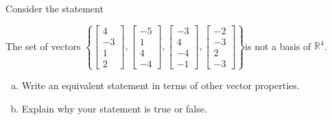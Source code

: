 
\begin{exerciseStatement}


Consider the statement 
\begin{center}\begin{minipage}{0.8\textwidth}
 The set of vectors \( \left\{ \left[\begin{array}{c}
4 \\
-3 \\
1 \\
2
\end{array}\right] , \left[\begin{array}{c}
-5 \\
1 \\
4 \\
-4
\end{array}\right] , \left[\begin{array}{c}
-3 \\
4 \\
-4 \\
-1
\end{array}\right] , \left[\begin{array}{c}
-2 \\
-3 \\
2 \\
-3
\end{array}\right] \right\} \)is not a basis of \(\mathbb{R}^4\). 
\end{minipage}\end{center}
    


\begin{enumerate}[(a)]
\item  Write an equivalent statement in terms of other vector properties.
\item  Explain why your statement is true or false.
\end{enumerate}
    
\end{exerciseStatement}
    
